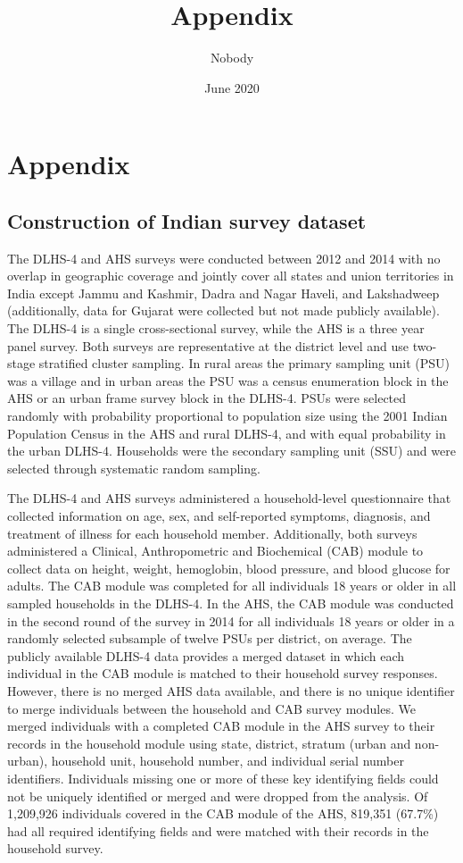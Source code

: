 \documentclass[10pt,letterpaper]{article}
\title{Appendix} \author{Nobody}
\numberwithin{equation}{section}
\begin{document}
\date{June 2020}
\section{Appendix}
\subsection{Construction of Indian survey dataset}
The DLHS-4 and AHS surveys were conducted between 2012 and 2014 with no overlap in geographic coverage and jointly cover all states and union territories in India except Jammu and Kashmir, Dadra and Nagar Haveli, and Lakshadweep (additionally, data for Gujarat were collected but not made publicly available). The DLHS-4 is a single cross-sectional survey, while the AHS is a three year panel survey. Both surveys are representative at the district level and use two-stage stratified cluster sampling. In rural areas the primary sampling unit (PSU) was a village and in urban areas the PSU was a census enumeration block in the AHS or an urban frame survey block in the DLHS-4. PSUs were selected randomly with probability proportional to population size using the 2001 Indian Population Census in the AHS and rural DLHS-4, and with equal probability in the urban DLHS-4. Households were the secondary sampling unit (SSU) and were selected through systematic random sampling.\cite{noauthor_annual_2014-1}

The DLHS-4 and AHS surveys administered a household-level questionnaire that collected information on age, sex, and self-reported symptoms, diagnosis, and treatment of illness for each household member. Additionally, both surveys administered a Clinical, Anthropometric and Biochemical (CAB) module to collect data on height, weight, hemoglobin, blood pressure, and blood glucose for adults. The CAB module was completed for all individuals 18 years or older in all sampled households in the DLHS-4. In the AHS, the CAB module was conducted in the second round of the survey in 2014 for all individuals 18 years or older in a randomly selected subsample of twelve PSUs per district, on average.\cite{noauthor_annual_2014} The publicly available DLHS-4 data provides a merged dataset in which each individual in the CAB module is matched to their household survey responses. However, there is no merged AHS data available, and there is no unique identifier to merge individuals between the household and CAB survey modules. We merged individuals with a completed CAB module in the AHS survey to their records in the household module using state, district, stratum (urban and non-urban), household unit, household number, and individual serial number identifiers. Individuals missing one or more of these key identifying fields could not be uniquely identified or merged and were dropped from the analysis. Of 1,209,926 individuals covered in the CAB module of the AHS, 819,351 (67.7\%) had all required identifying fields and were matched with their records in the household survey.  
\end{document}
